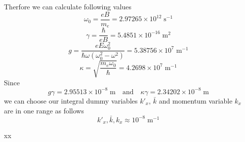 \noindent
Therfore we can calculate following values
\begin{equation} \label{5.8}
  \omega_0 = \frac{eB}{m_e} = 2.97265 \times 10^{12}\; \text{s}^{-1}
\end{equation}
\begin{equation} \label{5.9}
  \gamma = \frac{\hbar}{eB} = 5.4851 \times 10^{-16}\; \text{m}^{2}
\end{equation}
\begin{equation} \label{5.10}
  g = \frac{eE\omega_0^2}{\hbar\omega(\omega_0^2 - \omega^2)}
  = 5.38756 \times 10^{7}\; \text{m}^{-1}
\end{equation}
\begin{equation} \label{5.11}
  \kappa = \sqrt{\frac{m_e \omega_0}{\hbar}}
  = 4.2698 \times 10^{7}\; \text{m}^{-1}
\end{equation}
Since
\begin{equation} \label{5.12}
  g\gamma
  = 2.95513 \times 10^{-8}\; \text{m} \quad \text{and} \quad
  \kappa\gamma = 2.34202 \times 10^{-8}\; \text{m}
\end{equation}
we can choose our integral dummy variables ${k'}_x$, $\bar{k}$ and momentum variable $k_x$ are in one range as follows
\begin{equation} \label{5.13}
  {k'}_x,\bar{k},k_x \approx 10^{-8}\; \text{m}^{-1}
\end{equation}


















xx
